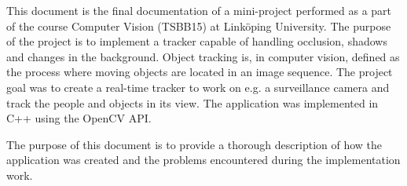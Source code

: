 This document is the final documentation of a mini-project performed as a part of the course Computer Vision (TSBB15) at Linköping University. The purpose of the project is to implement a tracker capable of handling occlusion, shadows and changes in the background. Object tracking is, in computer vision, defined as the process where moving objects are located in an image sequence. The project goal was to create a real-time tracker to work on e.g. a surveillance camera and track the people and objects in its view. The application was implemented in C++ using the OpenCV API.

The purpose of this document is to provide a thorough description of how the application was created and the problems encountered during the implementation work.
